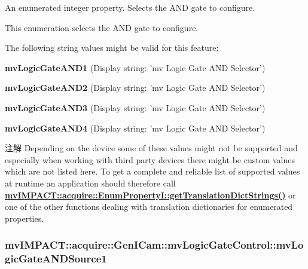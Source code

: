 An enumerated integer property. Selects the A\+N\+D gate to configure. 

This enumeration selects the A\+N\+D gate to configure.

The following string values might be valid for this feature\+:
\begin{DoxyItemize}
\item {\bfseries mv\+Logic\+Gate\+A\+N\+D1} (Display string\+: 'mv Logic Gate A\+N\+D Selector')
\item {\bfseries mv\+Logic\+Gate\+A\+N\+D2} (Display string\+: 'mv Logic Gate A\+N\+D Selector')
\item {\bfseries mv\+Logic\+Gate\+A\+N\+D3} (Display string\+: 'mv Logic Gate A\+N\+D Selector')
\item {\bfseries mv\+Logic\+Gate\+A\+N\+D4} (Display string\+: 'mv Logic Gate A\+N\+D Selector')
\end{DoxyItemize}

\begin{DoxyNote}{注解}
Depending on the device some of these values might not be supported and especially when working with third party devices there might be custom values which are not listed here. To get a complete and reliable list of supported values at runtime an application should therefore call {\bfseries \hyperlink{classmv_i_m_p_a_c_t_1_1acquire_1_1_enum_property_i_a0ba6ccbf5ee69784d5d0b537924d26b6}{mv\+I\+M\+P\+A\+C\+T\+::acquire\+::\+Enum\+Property\+I\+::get\+Translation\+Dict\+Strings()}} or one of the other functions dealing with translation dictionaries for enumerated properties. 
\end{DoxyNote}
\hypertarget{classmv_i_m_p_a_c_t_1_1acquire_1_1_gen_i_cam_1_1mv_logic_gate_control_aff3a8ed67455967905fcf463c85ff0f3}{
\subsubsection[{mv\+Logic\+Gate\+A\+N\+D\+Source1}]{ mv\+I\+M\+P\+A\+C\+T\+::acquire\+::\+Gen\+I\+Cam\+::mv\+Logic\+Gate\+Control\+::mv\+Logic\+Gate\+A\+N\+D\+Source1}}\label{classmv_i_m_p_a_c_t_1_1acquire_1_1_gen_i_cam_1_1mv_logic_gate_control_aff3a8ed67455967905fcf463c85ff0f3}


